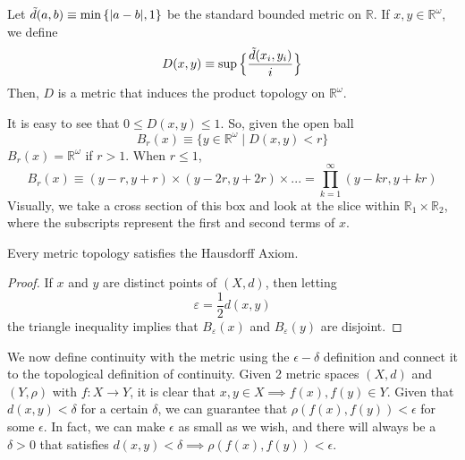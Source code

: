 \documentclass{article}
\begin{document}
    \begin{theorem}
    Let $\Tilde{d} (a, b) \equiv \min{\{|a-b|, 1\}}$ be the standard bounded metric on $\mathbb{R}$. If $x, y \in \mathbb{R}^\omega$, we define
    \[ D(x, y) \equiv \sup{\Big\{ \frac{\Tilde{d}(x_i, y_i)}{i}\Big\}}\]
    Then, $D$ is a metric that induces the product topology on $\mathbb{R}^\omega$. 
    \end{theorem}
    It is easy to see that $0 \leq D(x, y) \leq 1$. So, given the open ball
    \[B_r (x) \equiv \{y \in \mathbb{R}^\omega \; | \; D(x, y) < r\}\]
    $B_r (x) = \mathbb{R}^\omega$ if $r > 1$. When $r \leq 1$, 
    \[B_r (x) \equiv (y-r, y+r) \times (y-2r, y+2r) \times ... = \prod_{k=1}^\infty (y - k r , y + k r)\]
    Visually, we take a cross section of this box and look at the slice within $\mathbb{R}_1 \times \mathbb{R}_2$, where the subscripts represent the first and second terms of $x$. 
    \begin{center}
    \end{center}

    \begin{proposition}
    Every metric topology satisfies the Hausdorff Axiom.
    \end{proposition}
    \begin{proof}
    If $x$ and $y$ are distinct points of $(X, d)$, then letting
    \[\varepsilon = \frac{1}{2} d(x, y)\]
    the triangle inequality implies that $B_\varepsilon (x)$ and $B_\varepsilon (y)$ are disjoint. 
    \end{proof}

    We now define continuity with the metric using the $\epsilon - \delta$ definition and connect it to the topological definition of continuity. Given 2 metric spaces $(X, d)$ and $(Y, \rho)$ with $f: X \longrightarrow Y$, it is clear that $x, y \in X \implies f(x), f(y) \in Y$. Given that $d(x, y) < \delta$ for a certain $\delta$, we can guarantee that $\rho(f(x), f(y)) < \epsilon$ for some $\epsilon$. In fact, we can make $\epsilon$ as small as we wish, and there will always be a $\delta > 0$ that satisfies $d(x, y) < \delta \implies \rho(f(x), f(y)) < \epsilon$.  
\end{document}
